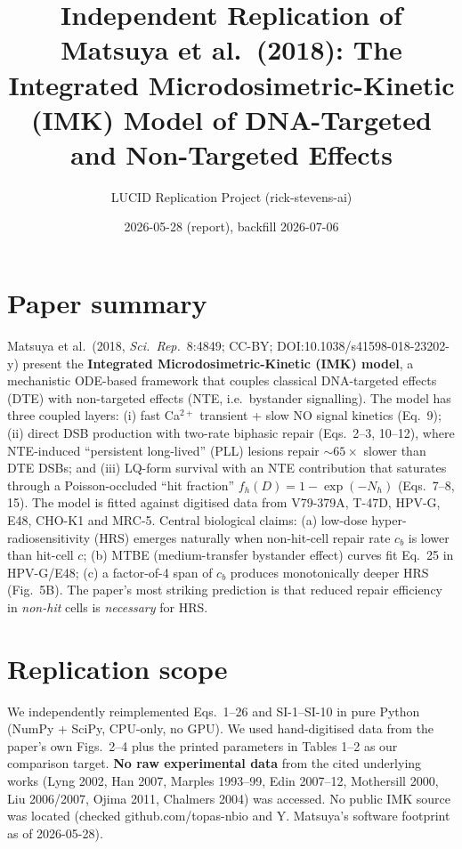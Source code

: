 \documentclass[11pt]{article}
\title{Independent Replication of Matsuya et al.\ (2018): The Integrated
Microdosimetric-Kinetic (IMK) Model of DNA-Targeted and Non-Targeted Effects}
\author{LUCID Replication Project (rick-stevens-ai)}
\date{2026-05-28 (report), backfill 2026-07-06}
\begin{document}
\maketitle

\section{Paper summary}
Matsuya et al.\ (2018, \emph{Sci.\ Rep.}\ 8:4849; CC-BY;
DOI:10.1038/s41598-018-23202-y) present the \textbf{Integrated
Microdosimetric-Kinetic (IMK) model}, a mechanistic ODE-based framework
that couples classical DNA-targeted effects (DTE) with non-targeted effects
(NTE, i.e.\ bystander signalling). The model has three coupled layers:
(i) fast Ca$^{2+}$ transient + slow NO signal kinetics (Eq.~9); (ii) direct
DSB production with two-rate biphasic repair (Eqs.~2--3, 10--12), where
NTE-induced ``persistent long-lived'' (PLL) lesions repair
$\sim\!65\times$ slower than DTE DSBs; and (iii) LQ-form survival with an
NTE contribution that saturates through a Poisson-occluded ``hit fraction''
$f_h(D)=1-\exp(-N_h)$ (Eqs.~7--8, 15). The model is fitted against digitised
data from V79-379A, T-47D, HPV-G, E48, CHO-K1 and MRC-5. Central biological
claims: (a) low-dose hyper-radiosensitivity (HRS) emerges naturally when
non-hit-cell repair rate $c_b$ is lower than hit-cell $c$; (b) MTBE
(medium-transfer bystander effect) curves fit Eq.~25 in HPV-G/E48;
(c) a factor-of-4 span of $c_b$ produces monotonically deeper HRS
(Fig.~5B). The paper's most striking prediction is that reduced repair
efficiency in \emph{non-hit} cells is \emph{necessary} for HRS.

\section{Replication scope}
We independently reimplemented Eqs.~1--26 and SI-1--SI-10 in pure Python
(NumPy + SciPy, CPU-only, no GPU). We used hand-digitised data from the
paper's own Figs.~2--4 plus the printed parameters in Tables 1--2 as our
comparison target. \textbf{No raw experimental data} from the cited
underlying works (Lyng 2002, Han 2007, Marples 1993--99, Edin 2007--12,
Mothersill 2000, Liu 2006/2007, Ojima 2011, Chalmers 2004) was accessed.
No public IMK source was located (checked github.com/topas-nbio and
Y. Matsuya's software footprint as of 2026-05-28).
\end{document}

